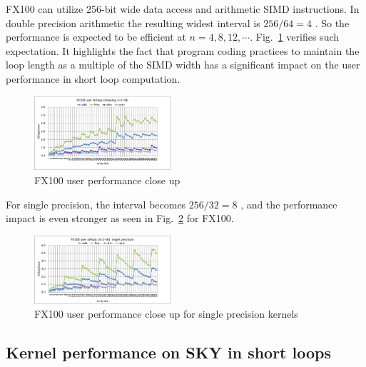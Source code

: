 \documentclass[conference]{IEEEtran}
\begin{document}
FX100 can utilize 256-bit wide data access and arithmetic SIMD instructions.
In double precision arithmetic the resulting widest interval is
\begin{math}
256 / 64 = 4
\end{math}
.
So the performance is expected to be efficient at $ n=4,8,12,\cdots $.
Fig.~\ref{fig:fx100-gflops-short-R8} verifies such expectation.
It highlights the fact that
program coding practices to maintain the loop length as a multiple of
the SIMD width has a significant impact on the user performance
in short loop computation.
\begin{figure}[tb]
\centering
\includegraphics[width=0.45\textwidth]{figs/fx100-gflops-short-R8.pdf}
\caption{FX100 user performance close up}
\label{fig:fx100-gflops-short-R8}
\end{figure}

For single precision, the interval becomes
\begin{math}
256 / 32 = 8
\end{math}
, and the performance impact is even stronger as seen in
Fig.~\ref{fig:fx100-gflops-short-R4} for FX100.
\begin{figure}[tb]
\centering
\includegraphics[width=0.45\textwidth]{figs/fx100-gflops-short-R4.pdf}
\caption{FX100 user performance close up for single precision kernels}
\label{fig:fx100-gflops-short-R4}
\end{figure}


\subsection{Kernel performance on SKY in short loops}
\label{subsection:short-kernels-sky}
\end{document}
